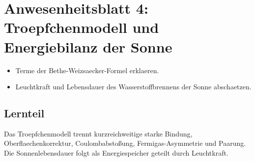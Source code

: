 \documentclass[11pt,a4paper]{scrartcl}
\begin{document}
\section{Anwesenheitsblatt 4: Troepfchenmodell und Energiebilanz der Sonne}
\begin{taskbox}\begin{itemize}\item Terme der Bethe-Weizsaecker-Formel erklaeren.\item Leuchtkraft und Lebensdauer des Wasserstoffbrennens der Sonne abschaetzen.\end{itemize}\end{taskbox}
\subsection{Lernteil}\begin{learningbox}Das Troepfchenmodell trennt kurzreichweitige starke Bindung, Oberflaechenkorrektur, Coulombabstoßung, Fermigas-Asymmetrie und Paarung. Die Sonnenlebensdauer folgt als Energiespeicher geteilt durch Leuchtkraft.\end{learningbox}
\end{document}
